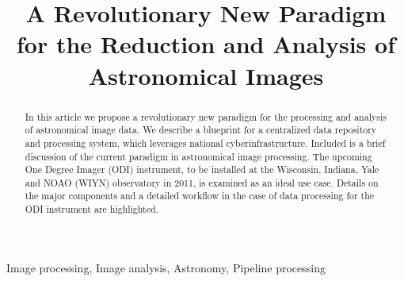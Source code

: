 \documentclass[10pt,conference]{IEEEtran}
\begin{document}
\title{A Revolutionary New Paradigm for the Reduction and Analysis of Astronomical Images}


\author{
}


\maketitle


\begin{abstract}
In this article we propose a revolutionary new paradigm for the processing and analysis of astronomical image data. We describe a blueprint for a centralized data repository and processing system, which leverages national cyberinfrastructure. Included is a brief discussion of the current paradigm in astronomical image processing. The upcoming One Degree Imager (ODI) instrument, to be installed at the Wisconsin, Indiana, Yale and NOAO (WIYN) observatory in 2011, is examined as an ideal use case. Details on the major components and a detailed workflow in the case of data processing for the ODI instrument are highlighted. 
\end{abstract}

\begin{IEEEkeywords}
Image processing, Image analysis, Astronomy, Pipeline processing
\end{IEEEkeywords}
\end{document}
